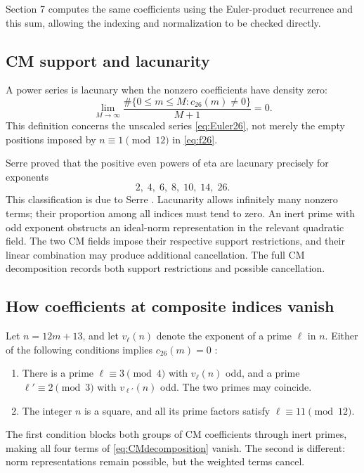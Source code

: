 \documentclass[a4paper,11pt]{article}
\theoremstyle{definition}
\begin{document}
Section 7 computes the same coefficients using the Euler-product recurrence
and this sum, allowing the indexing and normalization to be checked directly.
\subsection{CM support and lacunarity}
A power series is lacunary when the nonzero coefficients have density zero:
\begin{equation}\label{eq:lacunary}
 \lim_{M\to\infty}
 \frac{\#\{0\leq m\leq M:c_{26}(m)\ne0\}}{M+1}=0.
\end{equation}
This definition concerns the unscaled series \eqref{eq:Euler26},
not merely the empty positions imposed by \(n\equiv1\pmod{12}\)
in \eqref{eq:f26}.

Serre proved that the positive even powers of eta are lacunary precisely
for exponents
\begin{equation}\label{eq:Serrelist}
 2,\;4,\;6,\;8,\;10,\;14,\;26 .
\end{equation}
This classification is due to Serre \cite{Serre1985}. Lacunarity allows
infinitely many nonzero terms; their proportion among all indices must tend to zero.
An inert prime with odd exponent obstructs an ideal-norm representation
in the relevant quadratic field. The two CM fields impose their
respective support restrictions, and their linear combination may
produce additional cancellation. The full CM decomposition records both support restrictions
and possible cancellation.

\subsection{How coefficients at composite indices vanish}
Let \(n=12m+13\), and let \(v_\ell(n)\) denote the exponent of a prime
\(\ell\) in \(n\). Either of the following conditions implies
\(c_{26}(m)=0\) \cite{Serre1985}:
\begin{enumerate}
 \item There is a prime \(\ell\equiv3\pmod4\) with \(v_\ell(n)\) odd,
 and a prime \(\ell'\equiv2\pmod3\) with \(v_{\ell'}(n)\) odd.
 The two primes may coincide.
 \item The integer \(n\) is a square, and all its prime factors satisfy
 \(\ell\equiv11\pmod{12}\).
\end{enumerate}
The first condition blocks both groups of CM coefficients through
inert primes, making all four terms of \eqref{eq:CMdecomposition}
vanish. The second is different: norm representations remain possible,
but the weighted terms cancel.
\end{document}
